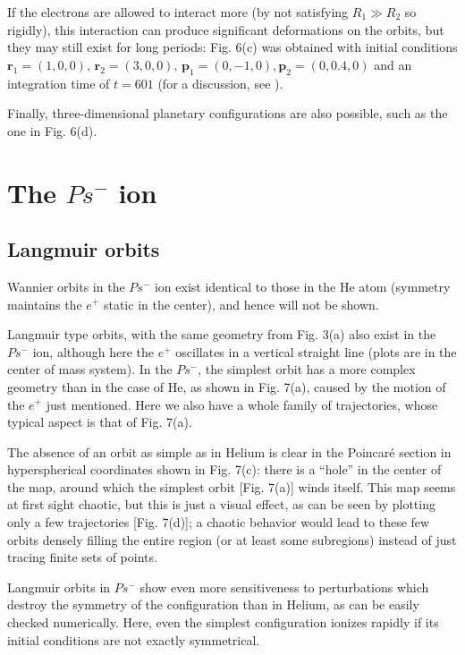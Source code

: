 \documentclass[thmsa]{article}
\begin{document}
If the electrons are allowed to interact more (by not satisfying $R_1\gg R_2$
so rigidly), this interaction can produce significant deformations on the
orbits, but they may still exist for long periods: Fig. 6(c) was obtained
with initial conditions $\mathbf{r}_1=\left( 1,0,0\right) ,\,\mathbf{r}%
_2=\left( 3,0,0\right) ,\,\mathbf{p}_1=\left( 0,-1,0\right) ,\mathbf{p}%
_2=\left( 0,0.4,0\right) $ and an integration time of $t=601$ (for a
discussion, see \cite{Yamamoto}).

Finally, three-dimensional planetary configurations are also possible, such
as the one in Fig. 6(d).

\section{The $Ps^{-}$ ion}

\subsection{Langmuir orbits}

Wannier orbits in the $Ps^{-}$ ion exist identical to those in the He atom
(symmetry maintains the $e^{+}$ static in the center), and hence will not be
shown.

Langmuir type orbits, with the same geometry from Fig. 3(a) also exist in
the $Ps^{-}$ ion, although here the $e^{+}$ oscillates in a vertical
straight line (plots are in the center of mass system). In the $Ps^{-}$, the
simplest orbit has a more complex geometry than in the case of He, as shown
in Fig. 7(a), caused by the motion of the $e^{+}$ just mentioned. Here we
also have a whole family of trajectories, whose typical aspect is that of
Fig. 7(a).

The absence of an orbit as simple as in Helium is clear in the Poincar\'e
section in hyperspherical coordinates shown in Fig. 7(c): there is a
``hole'' in the center of the map, around which the simplest orbit [Fig.
7(a)] winds itself. This map seems at first sight chaotic, but this is just
a visual effect, as can be seen by plotting only a few trajectories [Fig.
7(d)]; a chaotic behavior would lead to these few orbits densely filling the
entire region (or at least some subregions) instead of just tracing finite
sets of points.

Langmuir orbits in $Ps^{-}$ show even more sensitiveness to perturbations
which destroy the symmetry of the configuration than in Helium, as can be
easily checked numerically. Here, even the simplest configuration ionizes
rapidly if its initial conditions are not exactly symmetrical.
\end{document}
